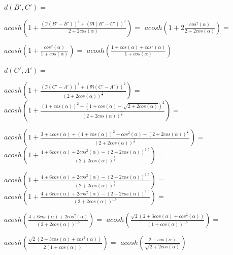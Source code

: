 \documentclass[a4paper,10pt]{article}
\begin{document}
\noindent$d\left(B', C'\right) = $

$acosh\left(1 + \frac{\left(\Im\left(B' - B'\right)\right)^{2} + \left(\Re\left(B' - C'\right)\right)^{2}}{2 + 2 cos\left(\alpha\right)}\right) =$
$acosh\left(1 + 2 \frac{cos^{2}\left(\alpha\right)}{2 + 2 cos\left(\alpha\right)}\right) =$

$acosh\left(1 + \frac{cos^{2}\left(\alpha\right)}{1 + cos\left(\alpha\right)}\right) =$
$acosh\left(\frac{1 + cos\left(\alpha\right) + cos^{2}\left(\alpha\right)}{1 + cos\left(\alpha\right)}\right) $


\noindent$ d\left(C', A'\right)=$

$acosh\left(1 + \frac{\left(\Im\left(C' - A'\right)\right)^{2} + \left(\Re\left(C' - A'\right)\right)^{2}}{\left(2 + 2 cos\left(\alpha\right)\right)^{\frac{3}{2}}}\right) =$
$acosh\left(1 + \frac{\left(1 + cos\left(\alpha\right)\right)^{2} + \left(1 + cos\left(\alpha\right) - \sqrt{2 + 2 cos\left(\alpha\right)}\right)^{2}}{\left(2 + 2 cos\left(\alpha\right)\right)^{\frac{3}{2}}}\right) =$

$acosh\left(1 + \frac{3 + 4 cos\left(\alpha\right) + \left(1 + cos\left(\alpha\right)\right)^{2} + cos^{2}\left(\alpha\right) - \left(2 + 2 cos\left(\alpha\right)\right)^{\frac{3}{2}}}{\left(2 + 2 cos\left(\alpha\right)\right)^{\frac{3}{2}}}\right) =$
$acosh\left(1 + \frac{4 + 6 cos\left(\alpha\right) + 2 cos^{2}\left(\alpha\right) - \left(2 + 2 cos\left(\alpha\right)\right)^{1.5}}{\left(2 + 2 cos\left(\alpha\right)\right)^{\frac{3}{2}}}\right) =$

$acosh\left(1 + \frac{4 + 6 cos\left(\alpha\right) + 2 cos^{2}\left(\alpha\right) - \left(2 + 2 cos\left(\alpha\right)\right)^{1.5}}{\left(2 + 2 cos\left(\alpha\right)\right)^{\frac{3}{2}}}\right) =$
$acosh\left(1 + \frac{4 + 6 cos\left(\alpha\right) + 2 cos^{2}\left(\alpha\right) - \left(2 + 2 cos\left(\alpha\right)\right)^{1.5}}{\left(2 + 2 cos\left(\alpha\right)\right)^{1.5}}\right) =$

$acosh\left(\frac{4 + 6 cos\left(\alpha\right) + 2 cos^{2}\left(\alpha\right)}{\left(2 + 2 cos\left(\alpha\right)\right)^{1.5}}\right) =$
$acosh\left(\frac{\sqrt{2} \left(2 + 3 cos\left(\alpha\right) + cos^{2}\left(\alpha\right)\right)}{\left(1 + cos\left(\alpha\right)\right)^{1.5}}\right) =$

$acosh\left(\frac{\sqrt{2} \left(2 + 3 cos\left(\alpha\right) + cos^{2}\left(\alpha\right)\right)}{2 \left(1 + cos\left(\alpha\right)\right)^{1.5}}\right) =$
$acosh\left(\frac{2 + cos\left(\alpha\right)}{\sqrt{2 + 2 cos\left(\alpha\right)}}\right)$
\end{document}
